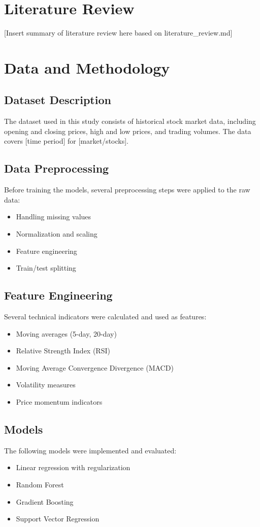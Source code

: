\documentclass[12pt,a4paper]{article}
\begin{document}
\section{Literature Review}
[Insert summary of literature review here based on literature\_review.md]

\section{Data and Methodology}
\subsection{Dataset Description}
The dataset used in this study consists of historical stock market data, including opening and closing prices, high and low prices, and trading volumes. The data covers [time period] for [market/stocks].

\subsection{Data Preprocessing}
Before training the models, several preprocessing steps were applied to the raw data:
\begin{itemize}
    \item Handling missing values
    \item Normalization and scaling
    \item Feature engineering
    \item Train/test splitting
\end{itemize}

\subsection{Feature Engineering}
Several technical indicators were calculated and used as features:
\begin{itemize}
    \item Moving averages (5-day, 20-day)
    \item Relative Strength Index (RSI)
    \item Moving Average Convergence Divergence (MACD)
    \item Volatility measures
    \item Price momentum indicators
\end{itemize}

\subsection{Models}
The following models were implemented and evaluated:
\begin{itemize}
    \item Linear regression with regularization
    \item Random Forest
    \item Gradient Boosting
    \item Support Vector Regression
\end{itemize}
\end{document}
